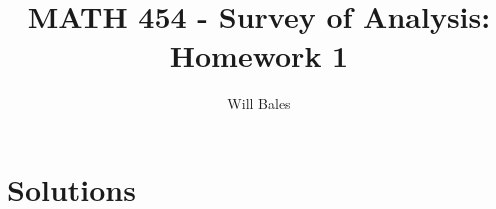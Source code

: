 \documentclass[10pt]{article}
\title{MATH 454 - Survey of Analysis: Homework 1}
\author{Will Bales}
\date{}
\theoremstyle{plain}
\newtheorem{theorem}{Theorem}[section]
\theoremstyle{definition}
\theoremstyle{remark}
\theoremstyle{exercise-style}
\numberwithin{equation}{section}
\numberwithin{theorem}{section}
\numberwithin{remark}{section}
\begin{document}
\maketitle

\section{Solutions}


\end{document}
